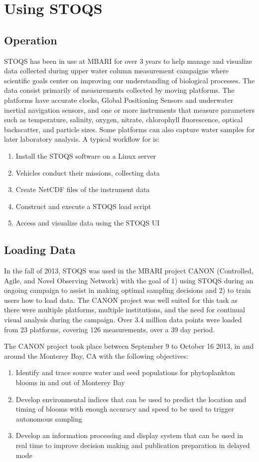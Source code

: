 \section{Using STOQS}

\subsection{Operation}

STOQS has been in use at MBARI for over 3 years to help manage and visualize data collected during upper water column measurement campaigns where scientific goals center on improving our understanding of biological processes. The data consist primarily of measurements collected by moving platforms. The platforms have accurate clocks, Global Positioning Sensors and underwater inertial navigation sensors, and one or more instruments that measure parameters such as temperature, salinity, oxygen, nitrate, chlorophyll fluorescence, optical backscatter, and particle sizes. Some platforms can also capture water samples for later laboratory analysis. A typical workflow for is:
\begin{enumerate}
\item Install the STOQS software on a Linux server
\item Vehicles conduct their missions, collecting data
\item Create NetCDF files of the instrument data
\item Construct and execute a STOQS load script
\item Access and visualize data using the STOQS UI
\end{enumerate}


\subsection{Loading Data}

In the fall of 2013, STOQS was used in the MBARI project CANON (Controlled, Agile, and Novel Observing Network) with the goal of 1) using STOQS during an ongoing campaign to assist in making optimal sampling decisions and 2) to train users how to load data.  The CANON project was well suited for this task as there were multiple platforms, multiple institutions, and the need for continual visual analysis during the campaign.  Over 3.4 million data points were loaded from 23 platforms, covering 126 measurements, over a 39 day period. 

The CANON project took place between September 9 to October 16 2013, in and around the Monterey Bay, CA with the following objectives: 
\begin{enumerate}
\item Identify and trace source water and seed populations for phytoplankton blooms in and out of Monterey Bay
\item Develop environmental indices that can be used to predict the location and timing of blooms with enough accuracy and speed to be used to trigger autonomous sampling
\item Develop an information processing and display system that can be used in real time to improve decision making and publication preparation in delayed mode
\end{enumerate}

